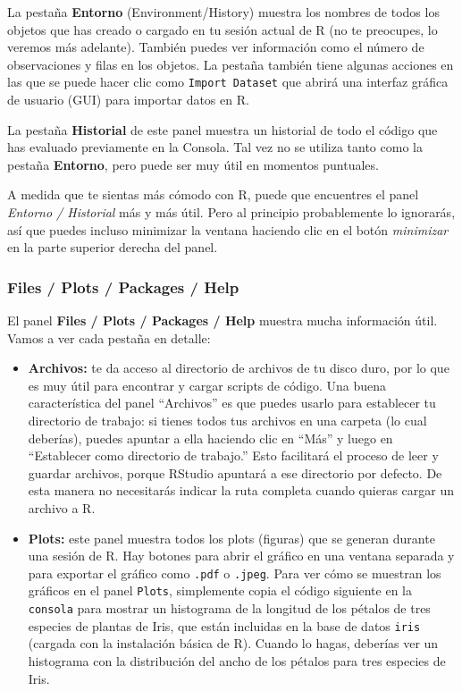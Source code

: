 \documentclass[
  letterpaper,
  DIV=11,
  numbers=noendperiod]{scrreprt}
\begin{document}
La pestaña \textbf{Entorno} (Environment/History) muestra los nombres de
todos los objetos que has creado o cargado en tu sesión actual de R (no
te preocupes, lo veremos más adelante). También puedes ver información
como el número de observaciones y filas en los objetos. La pestaña
también tiene algunas acciones en las que se puede hacer clic como
\texttt{Import\ Dataset} que abrirá una interfaz gráfica de usuario
(GUI) para importar datos en R.

La pestaña \textbf{Historial} de este panel muestra un historial de todo
el código que has evaluado previamente en la Consola. Tal vez no se
utiliza tanto como la pestaña \textbf{Entorno}, pero puede ser muy útil
en momentos puntuales.

A medida que te sientas más cómodo con R, puede que encuentres el panel
\emph{Entorno / Historial} más y más útil. Pero al principio
probablemente lo ignorarás, así que puedes incluso minimizar la ventana
haciendo clic en el botón \emph{minimizar} en la parte superior derecha
del panel.

\hypertarget{files-plots-packages-help}{%
\subsubsection{Files / Plots / Packages /
Help}\label{files-plots-packages-help}}

El panel \textbf{Files / Plots / Packages / Help} muestra mucha
información útil. Vamos a ver cada pestaña en detalle:

\begin{itemize}
\item
  \textbf{Archivos:} te da acceso al directorio de archivos de tu disco
  duro, por lo que es muy útil para encontrar y cargar scripts de
  código. Una buena característica del panel ``Archivos'' es que puedes
  usarlo para establecer tu directorio de trabajo: si tienes todos tus
  archivos en una carpeta (lo cual deberías), puedes apuntar a ella
  haciendo clic en ``Más'' y luego en ``Establecer como directorio de
  trabajo.'' Esto facilitará el proceso de leer y guardar archivos,
  porque RStudio apuntará a ese directorio por defecto. De esta manera
  no necesitarás indicar la ruta completa cuando quieras cargar un
  archivo a R.
\item
  \textbf{Plots:} este panel muestra todos los plots (figuras) que se
  generan durante una sesión de R. Hay botones para abrir el gráfico en
  una ventana separada y para exportar el gráfico como \texttt{.pdf} o
  \texttt{.jpeg}. Para ver cómo se muestran los gráficos en el panel
  \texttt{Plots}, simplemente copia el código siguiente en la
  \texttt{consola} para mostrar un histograma de la longitud de los
  pétalos de tres especies de plantas de Iris, que están incluidas en la
  base de datos \texttt{iris} (cargada con la instalación básica de R).
  Cuando lo hagas, deberías ver un histograma con la distribución del
  ancho de los pétalos para tres especies de Iris.
\end{itemize}
\end{document}
